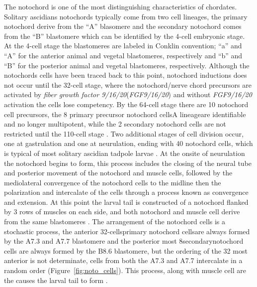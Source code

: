 The notochord is one of the most distinguishing characteristics of chordates. Solitary ascidians notochords typically come from two cell lineages, the primary notochord derive from the ``A'' blasomere and the secondary notochord comes from the ``B'' blastomere \cite{nishida_cell_1983} which can be identified by the 4-cell embryonic stage. At the 4-cell stage the blastomeres are labeled in Conklin \cite{conklin_organization_1905} convention; ``a'' and ``A'' for the anterior animal and vegetal blastomeres, respectively and ``b'' and ``B'' for the posterior animal and vegetal blastomeres, respectively. Although the notochords cells have been traced back to this point, notochord inductions does not occur until the 32-cell stage, where the notochord/nerve chord precursors are activated by \textit{fiber growth factor 9/16/20}(\textit{FGF9/16/20}) and without \textit{FGF9/16/20} activation the cells lose competency. By the 64-cell stage there are 10 notochord cell precursors, the 8 primary precursor notochord cells\textemdash A lineage\textemdash are identifiable and no longer multipotent, while the 2 secondary notochord cells are not restricted until the 110-cell stage \cite{nishida_cell_1985,yasuo_ascidian_1994,yasuo_conservation_1998,lemaire_unfolding_2009}. Two additional stages of cell division occur, one at gastrulation and one at neurulation, ending with 40 notochord cells, which is typical of most solitary ascidian tadpole larvae \cite{conklin_organization_1905}. At the onsite of neurulation the notochord begins to form, this process includes the closing of the neural tube and posterior movement of the notochord and muscle cells, followed by the mediolateral convergence of the notochord cells to the midline then the polarization and intercalate of the cells through a process known as convergence and extension\cite{swalla_mechanisms_1993}. At this point the larval tail is constructed of a notochord flanked by 3 rows of muscles on each side, and both notochord and muscle cell derive from the same blastomeres \cite{nishida_cell_1985}. The arrangement of the notochord cells is a stochastic process, the anterior 32-cells\textemdash primary notochord cells\textemdash are always formed by the A7.3 and A7.7 blastomere and the posterior most 8\textemdash secondary\textemdash notochord cells are always formed by the B8.6 blastomere, but the ordering of the 32 most anterior is not determinate, cells from both the A7.3 and A7.7 intercalate in a random order (Figure~\ref{fig:noto_cells})\cite{nishida_cell_1983,nishida_cell_1985,miyamoto_formation_1985, swalla_mechanisms_1993,kourakis_one-dimensional_2014}. This process, along with muscle cell are the causes the larval tail to form \cite{miyamoto_formation_1985, jeffery_factors_1992,swalla_mechanisms_1993}.


